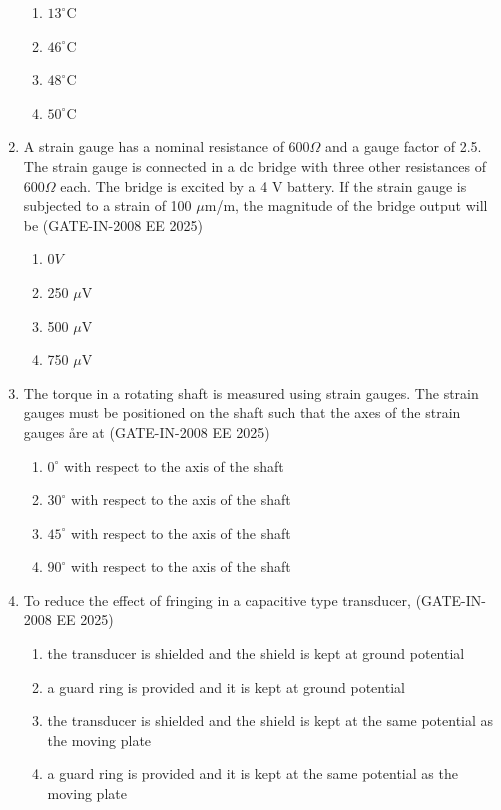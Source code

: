 \documentclass[journal,12pt,onecolumn]{IEEEtran}
\theoremstyle{remark}
\begin{document}
\begin{enumerate}[label=Q.\arabic*,start=1]
    \begin{enumerate} 
        \item  $13^{\circ}$C
        \item  $46^{\circ}$C
        \item  $48^{\circ}$C
        \item  $50^{\circ}$C
    \end{enumerate}
    
    \item A strain gauge has a nominal resistance of 600$\Omega$ and a gauge factor of 2.5. The strain gauge is
connected in a dc bridge with three other resistances of 600$\Omega$ each. The bridge is excited by a 4 V
battery. If the strain gauge is subjected to a strain of 100 $\mu$m/m, the magnitude of the bridge output will be (GATE-IN-2008 EE 2025)

    \begin{enumerate} 
        \item  $0 V$
        \item  250 $\mu$V
        \item  500 $\mu$V
        \item  750 $\mu$V
    \end{enumerate}
    
    \item The torque in a rotating shaft is measured using strain gauges. The strain gauges must be positioned
on the shaft such that the axes of the strain gauges åre at (GATE-IN-2008 EE 2025)
    \begin{enumerate} 
        \item  $0^{\circ}$ with respect to the axis of the shaft 
        \item  $30^{\circ}$ with respect to the axis of the shaft
        \item  $45^{\circ}$ with respect to the axis of the shaft
        \item  $90^{\circ}$ with respect to the axis of the shaft
    \end{enumerate}
    
    \item To reduce the effect of fringing in a capacitive type transducer, (GATE-IN-2008 EE 2025)
    \begin{enumerate} 
        \item  the transducer is shielded and the shield is kept at ground potential  
        \item  a guard ring is provided and it is kept at ground potential  
        \item   the transducer is shielded and the shield is kept at the same potential as the moving plate
        \item a guard ring is provided and it is kept at the same potential as the moving plate
    \end{enumerate}


\end{enumerate}
\end{document}
